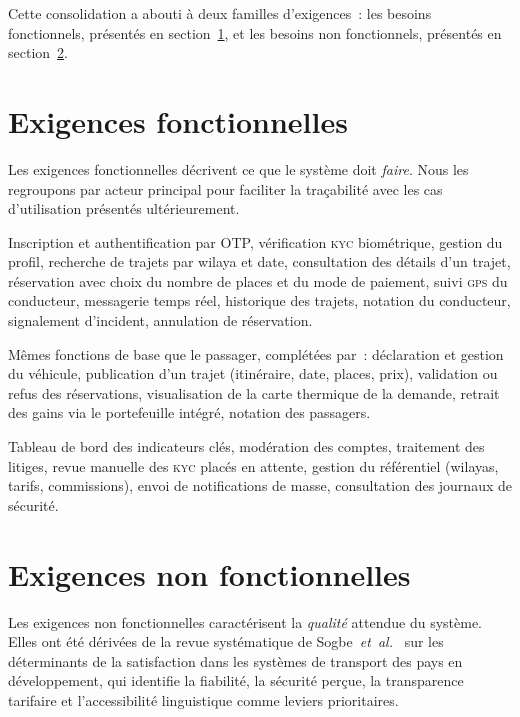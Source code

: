 \documentclass[12pt, a4paper, oneside]{report}
\begin{document}
Cette consolidation a abouti à deux familles d'exigences~: les besoins fonctionnels, présentés en section~\ref{sec:exigences-fonc}, et les besoins non fonctionnels, présentés en section~\ref{sec:exigences-nonfonc}.

\section{Exigences fonctionnelles}
\label{sec:exigences-fonc}

Les exigences fonctionnelles décrivent ce que le système doit \textit{faire}. Nous les regroupons par acteur principal pour faciliter la traçabilité avec les cas d'utilisation présentés ultérieurement.

\begin{funcreq}[title={\textbf{EF~1 — Passager}}]
Inscription et authentification par OTP, vérification \textsc{kyc} biométrique, gestion du profil, recherche de trajets par wilaya et date, consultation des détails d'un trajet, réservation avec choix du nombre de places et du mode de paiement, suivi \textsc{gps} du conducteur, messagerie temps réel, historique des trajets, notation du conducteur, signalement d'incident, annulation de réservation.
\end{funcreq}

\begin{funcreq}[title={\textbf{EF~2 — Conducteur}}]
Mêmes fonctions de base que le passager, complétées par~: déclaration et gestion du véhicule, publication d'un trajet (itinéraire, date, places, prix), validation ou refus des réservations, visualisation de la carte thermique de la demande, retrait des gains via le portefeuille intégré, notation des passagers.
\end{funcreq}

\begin{funcreq}[title={\textbf{EF~3 — Administrateur}}]
Tableau de bord des indicateurs clés, modération des comptes, traitement des litiges, revue manuelle des \textsc{kyc} placés en attente, gestion du référentiel (wilayas, tarifs, commissions), envoi de notifications de masse, consultation des journaux de sécurité.
\end{funcreq}

\section{Exigences non fonctionnelles}
\label{sec:exigences-nonfonc}

Les exigences non fonctionnelles caractérisent la \textit{qualité} attendue du système. Elles ont été dérivées de la revue systématique de Sogbe~\textit{et~al.}~\cite{sogbe_public_transport_2024} sur les déterminants de la satisfaction dans les systèmes de transport des pays en développement, qui identifie la fiabilité, la sécurité perçue, la transparence tarifaire et l'accessibilité linguistique comme leviers prioritaires.
\end{document}
